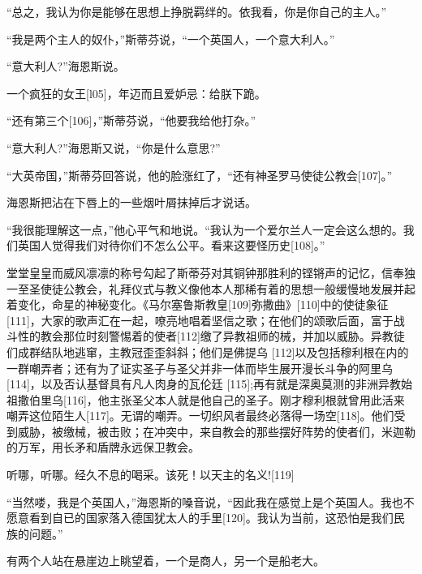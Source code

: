 \documentclass{article}
\begin{document}
“总之，我认为你是能够在思想上挣脱羁绊的。依我看，你是你自己的主人。”



“我是两个主人的奴仆，”斯蒂芬说，“一个英国人，一个意大利人。”



“意大利人?”海恩斯说。



一个疯狂的女王[l05]，年迈而且爱妒忌：给朕下跪。



“还有第三个[106]，”斯蒂芬说，“他要我给他打杂。”



“意大利人?”海恩斯又说，“你是什么意思?”



“大英帝国，”斯蒂芬回答说，他的脸涨红了，“还有神圣罗马使徒公教会[107]。”



海恩斯把沾在下唇上的一些烟叶屑抹掉后才说话。



“我很能理解这一点，”他心平气和地说。“我认为一个爱尔兰人一定会这么想的。我们英国人觉得我们对待你们不怎么公平。看来这要怪历史[108]。”



堂堂皇皇而威风凛凛的称号勾起了斯蒂芬对其铜钟那胜利的铿锵声的记忆，信奉独一至圣使徒公教会，礼拜仪式与教义像他本人那稀有着的思想一般缓慢地发展并起着变化，命星的神秘变化。《马尔塞鲁斯教皇[109]弥撒曲》[110]中的使徒象征[111]，大家的歌声汇在一起，嘹亮地唱着坚信之歌；在他们的颂歌后面，富于战斗性的教会那位时刻警惕着的使者[112]缴了异教祖师的械，并加以威胁。异教徒们成群结队地逃窜，主教冠歪歪斜斜；他们是佛提乌 [112]以及包括穆利根在内的一群嘲弄者；还有为了证实圣子与圣父并非一体而毕生展开漫长斗争的阿里乌[114]，以及否认基督具有凡人肉身的瓦伦廷 [115];再有就是深奥莫测的非洲异教始祖撒伯里乌[116]，他主张圣父本人就是他自己的圣子。刚才穆利根就曾用此活来嘲弄这位陌生人[117]。无谓的嘲弄。一切织风者最终必落得一场空[118]。他们受到威胁，被缴械，被击败；在冲突中，来自教会的那些摆好阵势的使者们，米迦勒的万军，用长矛和盾牌永远保卫教会。



听哪，听哪。经久不息的喝采。该死！以天主的名义![119]



“当然喽，我是个英国人，”海恩斯的嗓音说，“因此我在感觉上是个英国人。我也不愿意看到自已的国家落入德国犹太人的手里[120]。我认为当前，这恐怕是我们民族的问题。”



有两个人站在悬崖边上眺望着，一个是商人，另一个是船老大。
\end{document}
